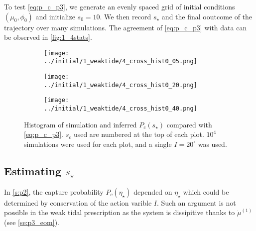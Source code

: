 \documentclass[
        fleqn,
        usenatbib,
    ]{mnras}
\begin{document}
To test \autoref{eq:p_c_p3}, we generate an evenly spaced grid of initial
conditions $(\mu_0, \phi_0)$ and initialize $s_0 = 10$. We then record $s_\star$
and the final ooutcome of the trajectory over many simulations. The agreement of
\autoref{eq:p_c_p3} with data can be observed in \autoref{fig:1_4stats}.
\begin{figure}
    \centering
    \begin{subfigure}{\columnwidth}
        \centering
        \texttt{[image: ../initial/1\_weaktide/4\_cross\_hist0\_05.png]}
    \end{subfigure}

    \begin{subfigure}{\columnwidth}
        \centering
        \texttt{[image: ../initial/1\_weaktide/4\_cross\_hist0\_20.png]}
    \end{subfigure}

    \begin{subfigure}{\columnwidth}
        \centering
        \texttt{[image: ../initial/1\_weaktide/4\_cross\_hist0\_40.png]}
    \end{subfigure}

    \caption{Histogram of simulation and inferred $P_c(s_\star)$ compared with
    \autoref{eq:p_c_p3}. $s_c$ used are numbered at the top of each plot. $10^4$
    simulations were used for each plot, and a single $I = 20^\circ$ was
    used.}\label{fig:1_4stats}
\end{figure}

\subsection{Estimating $s_\star$}

In \autoref{s:p2}, the capture probability $P_c(\eta_\star)$ depended on
$\eta_\star$ which could be determined by conservation of the action varible
$I$. Such an argument is not possible in the weak tidal prescription as the
system is dissipitive thanks to $\dot{\mu}^{(1)}$ (see \autoref{se:p3_eom}).
\end{document}

